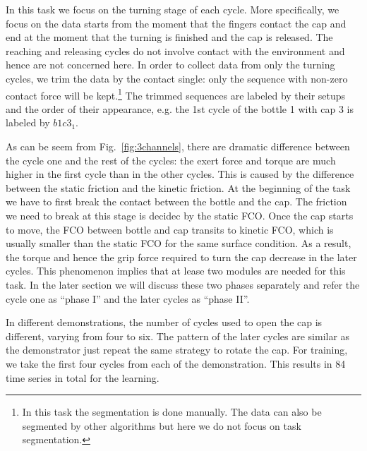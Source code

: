 In this task we focus on the turning stage of each cycle. More specifically, we focus on the data starts from the moment that the fingers contact the cap and end at the moment that the turning is finished and the cap is released. The reaching and releasing cycles do not involve contact with the environment and hence are not concerned here.
In order to collect data from only the turning cycles, we trim the data by the contact single: only the sequence with non-zero contact force will be kept.\footnote{In this task the segmentation is done manually. The data can also be segmented by other algorithms but here we do not focus on task segmentation.} The trimmed sequences are labeled by their setups and the order of their appearance, e.g. the 1st cycle of the bottle 1 with cap 3 is labeled by $b1c3_1$.

As can be seem from Fig.~\ref{fig:3channels}, there are dramatic difference between the cycle one and the rest of the cycles: the exert force and torque are much higher in the first cycle than in the other cycles. This is caused by the difference between the static friction and the kinetic friction. At the beginning of the task we have to first break the contact between the bottle and the cap. The friction we need to break at this stage is decidec by the static FCO. Once the cap starts to move, the FCO between bottle and cap transits to kinetic FCO, which is usually smaller than the static FCO for the same surface condition. As a result, the torque and hence the grip force required to turn the cap decrease in the later cycles. This phenomenon implies that at lease two modules are needed for this task. In the later section we will discuss these two phases separately and refer the cycle one as ``phase I'' and the later cycles as ``phase II''.

In different demonstrations, the number of cycles used to open the cap is different, varying from four to six. The pattern of the later cycles  are similar as the demonstrator just repeat the same strategy to rotate the cap. For training, we take the first four cycles from each of the demonstration. This results in 84 time series in total for the learning.








